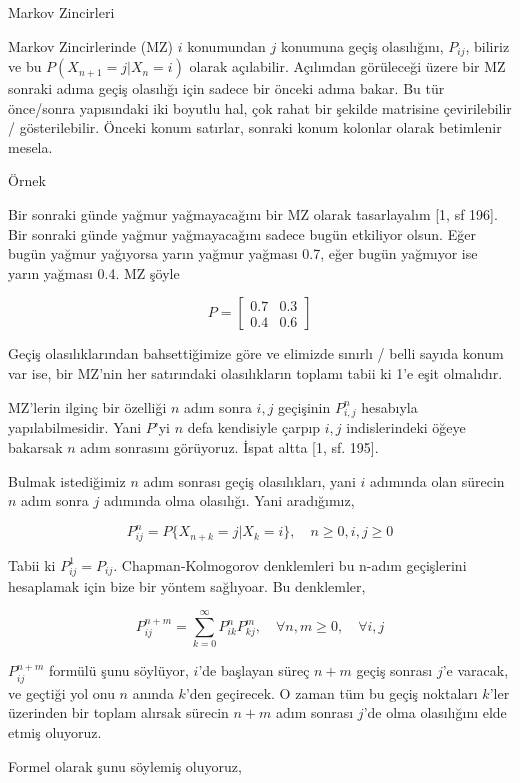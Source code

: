 \documentclass[12pt,fleqn]{article}\usepackage{../../common}
\begin{document}
Markov Zincirleri

Markov Zincirlerinde (MZ) $i$ konumundan $j$ konumuna geçiş olasılığını,
$P_{ij}$, biliriz ve bu $P(X_{n+1} = j | X_{n} = i)$ olarak açılabilir. Açılımdan  
görüleceği üzere bir MZ sonraki adıma geçiş olasılığı için sadece
bir önceki adıma bakar. Bu tür önce/sonra yapısındaki iki boyutlu hal, 
çok rahat bir şekilde matrisine çevirilebilir / gösterilebilir. Önceki konum 
satırlar, sonraki konum kolonlar olarak betimlenir mesela. 

Örnek

Bir sonraki günde yağmur yağmayacağını bir MZ olarak tasarlayalım [1, sf 196].
Bir sonraki günde yağmur yağmayacağını sadece bugün etkiliyor olsun. Eğer bugün
yağmur yağıyorsa yarın yağmur yağması 0.7, eğer bugün yağmıyor ise yarın
yağması 0.4. MZ şöyle

$$ 
P =
\left[\begin{array}{cc}
0.7 & 0.3 \\
0.4 & 0.6
\end{array}\right]
$$

Geçiş olasılıklarından bahsettiğimize göre ve elimizde sınırlı / belli
sayıda konum var ise, bir MZ'nin her satırındaki olasılıkların toplamı
tabii ki 1'e eşit olmalıdır. 

MZ'lerin ilginç bir özelliği $n$ adım sonra $i,j$ geçişinin $P_{i,j}^n$
hesabıyla yapılabilmesidir. Yani $P$'yi $n$ defa kendisiyle çarpıp $i,j$
indislerindeki öğeye bakarsak $n$ adım sonrasını görüyoruz. İspat altta [1, sf. 195].

Bulmak istediğimiz $n$ adım sonrası geçiş olasılıkları, yani $i$ adımında olan
sürecin $n$ adım sonra $j$ adımında olma olasılığı. Yani aradığımız,

$$
P_{ij}^n = P \{ X_{n+k} = j | X_k = i \}, \quad n \ge 0, i,j \ge 0
$$

Tabii ki $P_{ij}^1 = P_{ij}$. Chapman-Kolmogorov denklemleri bu n-adım
geçişlerini hesaplamak için bize bir yöntem sağlıyoar. Bu denklemler,

$$
P_{ij}^{n+m} = \sum _{k=0}^{\infty} P_{ik}^n P_{kj}^m,
\quad \forall n,m \ge 0, \quad \forall i,j
$$

$P_{ij}^{n+m}$ formülü şunu söylüyor, $i$'de başlayan süreç $n+m$ geçiş sonrası
$j$'e varacak, ve geçtiği yol onu $n$ anında $k$'den geçirecek. O zaman tüm bu
geçiş noktaları $k$'ler üzerinden bir toplam alırsak sürecin $n+m$ adım sonrası
$j$'de olma olasılığını elde etmiş oluyoruz.

Formel olarak şunu söylemiş oluyoruz,
\end{document}
